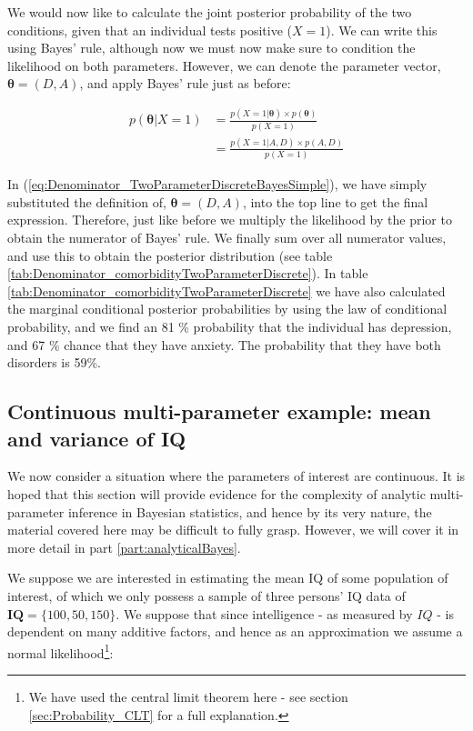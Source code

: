 \documentclass[11pt,fullpage]{book}
\begin{document}
We would now like to calculate the joint posterior probability of the two conditions, given that an individual tests positive ($X=1$). We can write this using Bayes' rule, although now we must now make sure to condition the likelihood on both parameters. However, we can denote the parameter vector, $\boldsymbol{\theta}=(D,A)$, and apply Bayes' rule just as before:

\begin{equation}\label{eq:Denominator_TwoParameterDiscreteBayesSimple}
\begin{align}
p(\boldsymbol{\theta}|X=1) &= \frac{p(X=1|\boldsymbol{\theta})\times p(\boldsymbol{\theta})}{p(X=1)}\\
& = \frac{p(X=1|A,D)\times p(A,D)}{p(X=1)}
\end{align}
\end{equation}

In (\ref{eq:Denominator_TwoParameterDiscreteBayesSimple}), we have simply substituted the definition of, $\boldsymbol{\theta}=(D,A)$, into the top line to get the final expression. Therefore, just like before we multiply the likelihood by the prior to obtain the numerator of Bayes' rule. We finally sum over all numerator values, and use this to obtain the posterior distribution (see table \ref{tab:Denominator_comorbidityTwoParameterDiscrete}). In table \ref{tab:Denominator_comorbidityTwoParameterDiscrete} we have also calculated the marginal conditional posterior probabilities by using the law of conditional probability, and we find an 81 \% probability that the individual has depression, and 67 \% chance that they have anxiety. The probability that they have both disorders is 59\%.

\subsection{Continuous multi-parameter example: mean and variance of IQ}\label{sec:Denominator_continuousTwoParameterIQ}
We now consider a situation where the parameters of interest are continuous. It is hoped that this section will provide evidence for the complexity of analytic multi-parameter inference in Bayesian statistics, and hence by its very nature, the material covered here may be difficult to fully grasp. However, we will cover it in more detail in part \ref{part:analyticalBayes}.

We suppose we are interested in estimating the mean IQ of some population of interest, of which we only possess a sample of three persons' IQ data of $\boldsymbol{IQ}=\{100,50,150\}$. We suppose that since intelligence - as measured by $IQ$ - is dependent on many additive factors, and hence as an approximation we assume a normal likelihood\footnote{We have used the central limit theorem here - see section \ref{sec:Probability_CLT} for a full explanation.}:
\end{document}
